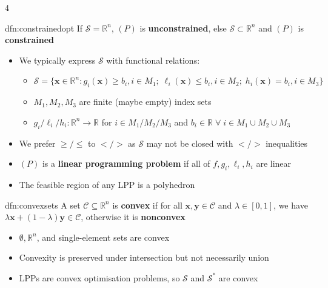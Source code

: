 \documentclass[landscape, 8pt]{extarticle}
\begin{document}
\begin{multicols*}{4}
		
		\begin{mdfn}{dfn:constrainedopt}{ }
			If $\mathcal{S} = \mathbb{R}^n$, $(P)$ is \textbf{unconstrained}, else $\mathcal{S} \subset \mathbb{R}^n$ and $(P)$ is \textbf{constrained}
			\begin{itemize}
				\item We typically express $\mathcal{S}$ with functional relations:
					\begin{itemize}
						\item $\mathcal{S} = \{\mathbf{x}\in \mathbb{R}^n : g_i(\mathbf{x}) \ge b_i, i\in M_1;\; \ell_i(\mathbf{x}) \le b_i, i\in M_2; \; h_i(\mathbf{x})=b_i, i\in M_3\}$
						\item $M_1, M_2, M_3$ are finite (maybe empty) index sets
						\item $g_i/\ell_i/h_i: \mathbb{R}^n \to \mathbb{R}$ for $i\in M_1/M_2/M_3$ and $b_i\in \mathbb{R} \; \forall \; i\in M_1 \cup M_2 \cup M_3$
					\end{itemize}
				\item We prefer $\ge/\le$ to $</>$ as $\mathcal{S}$ may not be closed with $</>$ inequalities\\
				\item $(P)$ is a \textbf{linear programming problem} if all of $f, g_i, \ell_i, h_i$ are linear
				\item The feasible region of any LPP is a polyhedron
			\end{itemize}
			
		\end{mdfn}
		
		
		\begin{dfn}{dfn:convexsets}{ }
			A set $\mathcal{C} \subseteq \mathbb{R}^n$ is \textbf{convex} if for all $\mathbf{x, y}\in \mathcal{C}$ and $\lambda\in [0, 1]$, we have $\lambda \mathbf{x} + (1-\lambda)\mathbf{y}\in \mathcal{C}$, otherwise it is \textbf{nonconvex}
			\begin{itemize}
				\item $\emptyset, \mathbb{R}^n$, and single-element sets are convex
				\item Convexity is preserved under intersection but not necessarily union
				\item LPPs are convex optimisation problems, so $\mathcal{S}$ and $\mathcal{S}^*$ are convex
			\end{itemize}
			

\end{dfn}
\end{multicols*}
\end{document}
